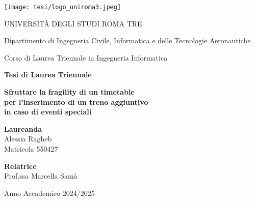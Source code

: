 \documentclass[a4paper,12pt]{report}
\begin{document}
\begin{titlepage}
    \centering
    
    \texttt{[image: tesi/logo\_uniroma3.jpeg]}\par\vspace{0.5cm}
    
    {\large UNIVERSITÀ DEGLI STUDI ROMA TRE}\par
    \vspace{0.2cm}
    {\normalsize Dipartimento di Ingegneria Civile, Informatica e delle Tecnologie Aeronautiche}\par
    {\normalsize Corso di Laurea Triennale in Ingegneria Informatica}\par
    \vspace{1.5cm}
    
    {\large \textbf{Tesi di Laurea Triennale}}\par
    \vspace{1.5cm}
    
    {\Large \textbf{Sfruttare la fragility di un timetable \\ 
    per l'inserimento di un treno aggiuntivo \\ 
    in caso di eventi speciali}}\par
    \vspace{2cm}
    
    \begin{center}
    \textbf{Laureanda} \\
    Alessia Ragheb \\
    Matricola 550427
    \end{center}
    
    \vspace{1.2cm}
    
    \begin{flushleft}
    \textbf{Relatrice} \\
    Prof.ssa Marcella Samà
    \end{flushleft}
    
    \vfill
    
    {\normalsize Anno Accademico 2024/2025}\par
\end{titlepage}

\tableofcontents
\newpage

\end{document}
